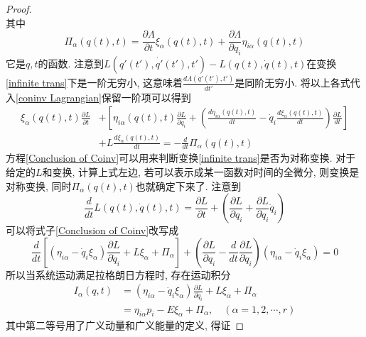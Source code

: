 \documentclass[a4paper,11pt]{book}
\newtheorem{proof}{证明}[section]
\begin{document}
\begin{proof}
\begin{equation*}
  \end{equation*}
  其中
  \begin{equation}\label{Pi_alpha}
    \Pi_\alpha(q(t),t)=\frac{\partial \Lambda}{\partial t}\xi_\alpha(q(t),t)+\frac{\partial \Lambda}{\partial{q_i}}\eta_{i\alpha}(q(t),t)
  \end{equation}
  它是$q,t$的函数. 注意到$L(q'(t'),\dot{q'}(t'),t')-L(q(t),\dot{q}(t),t)$在变换\eqref{infinite trans}下是一阶无穷小, 这意味着$\frac{d\Lambda(q'(t'),t')}{dt'}$是同阶无穷小. 将以上各式代入\eqref{coninv Lagrangian}保留一阶项可以得到
  \begin{equation}\label{Conclusion of Coinv}
  \begin{split}
     \xi_\alpha(q(t),t)\frac{\partial L}{\partial t}&+\left[\eta_{i\alpha}(q(t),t)\frac{\partial L}{\partial{q}_i}+\left(\frac{d\eta_{i\alpha}(q(t),t)}{dt}-\dot{q}_i\frac{d\xi_\alpha(q(t),t)}{dt}\right)\frac{\partial L}{dt}\right] \\
     &+L\frac{d\xi_\alpha(q(t),t)}{dt}=-\frac{d}{dt}\Pi_\alpha(q(t),t)
  \end{split}
  \end{equation}
  方程\eqref{Conclusion of Coinv}可以用来判断变换\eqref{infinite trans}是否为对称变换. 对于给定的$L$和变换, 计算上式左边, 若可以表示成某一函数对时间的全微分, 则变换是对称变换, 同时$\Pi_\alpha(q(t),t)$也就确定下来了. 注意到
  \begin{equation*}
    \frac{d}{dt}L(q(t),\dot{q}(t),t)=\frac{\partial L}{\partial t}+\left(\frac{\partial L}{\partial{q_i}}+\frac{\partial L}{\partial{\dot{q}_i}}\ddot{q}_i\right)
  \end{equation*}
  可以将式子\eqref{Conclusion of Coinv}改写成
  \begin{equation*}
    \frac{d}{dt}\left[(\eta_{i\alpha}-\dot{q}_i\xi_\alpha)\frac{\partial L}{\partial\dot{q}_i}+L\xi_\alpha+\Pi_\alpha\right]+\left(\frac{\partial L}{\partial{q}_i}-\frac{d}{dt}\frac{\partial L}{\partial\dot{q}_i}\right)(\eta_{i\alpha}-\dot{q}_i\xi_\alpha)=0
  \end{equation*}
  所以当系统运动满足拉格朗日方程时, 存在运动积分
  \begin{equation}\label{Movement Integrate}
  \begin{split}
     I_\alpha(q,t)&=(\eta_{i\alpha}-\dot{q}_i\xi_\alpha)\frac{\partial L}{\partial\dot{q}_i}+L\xi_\alpha+\Pi_\alpha \\
       &=\eta_{i\alpha}p_i-E\xi_\alpha+\Pi_\alpha,\quad (\alpha=1,2,\cdots,r)
  \end{split}
  \end{equation}
  其中第二等号用了广义动量和广义能量的定义, 得证
\end{proof}
\end{document}
